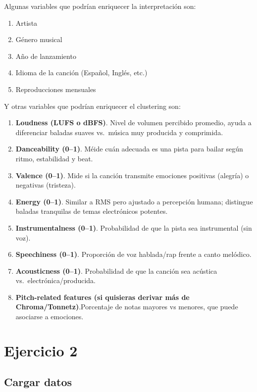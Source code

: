 \documentclass[11pt]{article}
\providecommand{\tightlist}{%
      \setlength{\itemsep}{0pt}\setlength{\parskip}{0pt}}
\begin{document}
Algunas variables que podrían enriquecer la interpretación son:

\begin{enumerate}
\def\labelenumi{\arabic{enumi}.}
\tightlist
\item
  Artista
\item
  Género musical
\item
  Año de lanzamiento
\item
  Idioma de la canción (Español, Inglés, etc.)
\item
  Reproducciones mensuales
\end{enumerate}

Y otras variables que podrían enriquecer el clustering son:

\begin{enumerate}
\def\labelenumi{\arabic{enumi}.}
\tightlist
\item
  \textbf{Loudness (LUFS o dBFS)}. Nivel de volumen percibido promedio,
  ayuda a diferenciar baladas suaves vs.~música muy producida y
  comprimida.
\item
  \textbf{Danceability (0--1)}. Méide cuán adecuada es una pista para
  bailar según ritmo, estabilidad y beat.
\item
  \textbf{Valence (0--1)}. Mide si la canción transmite emociones
  positivas (alegría) o negativas (tristeza).
\item
  \textbf{Energy (0--1)}. Similar a RMS pero ajustado a percepción
  humana; distingue baladas tranquilas de temas electrónicos potentes.
\item
  \textbf{Instrumentalness (0--1)}. Probabilidad de que la pista sea
  instrumental (sin voz).
\item
  \textbf{Speechiness (0--1)}. Proporción de voz hablada/rap frente a
  canto melódico.
\item
  \textbf{Acousticness (0--1)}. Probabilidad de que la canción sea
  acústica vs.~electrónica/producida.
\item
  \textbf{Pitch-related features (si quisieras derivar más de
  Chroma/Tonnetz)}.Porcentaje de notas mayores vs menores, que puede
  asociarse a emociones.
\end{enumerate}

    \hypertarget{ejercicio-2}{%
\section{Ejercicio 2}\label{ejercicio-2}}

    \hypertarget{cargar-datos}{%
\subsection{Cargar datos}\label{cargar-datos}}
\end{document}
